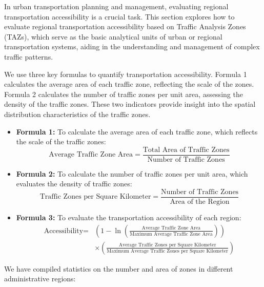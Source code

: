 \documentclass{mcmthesis}
\begin{document}
In urban transportation planning and management, evaluating regional transportation accessibility is a crucial task. This section explores how to evaluate regional transportation accessibility based on Traffic Analysis Zones (TAZs), which serve as the basic analytical units of urban or regional transportation systems, aiding in the understanding and management of complex traffic patterns.

We use three key formulas to quantify transportation accessibility. Formula 1 calculates the average area of each traffic zone, reflecting the scale of the zones. Formula 2 calculates the number of traffic zones per unit area, assessing the density of the traffic zones. These two indicators provide insight into the spatial distribution characteristics of the traffic zones.


\begin{itemize}
    \item \textbf{Formula 1:} To calculate the average area of each traffic zone, which reflects the scale of the traffic zones:
    \[
    \text{Average Traffic Zone Area} = \frac{\text{Total Area of Traffic Zones}}{\text{Number of Traffic Zones}}
    \]

    \item \textbf{Formula 2:} To calculate the number of traffic zones per unit area, which evaluates the density of traffic zones:
    \[
    \text{Traffic Zones per Square Kilometer} = \frac{\text{Number of Traffic Zones}}{\text{Area of the Region}}
    \]

    \item \textbf{Formula 3:} To evaluate the transportation accessibility of each region:
    \[
\begin{split}
\text{Accessibility} = &\left( 1 - \ln \left( \frac{\text{Average Traffic Zone Area}}{\text{Maximum Average Traffic Zone Area}} \right) \right) \\
&\times \left( \frac{\text{Average Traffic Zones per Square Kilometer}}{\text{Maximum Average Traffic Zones per Square Kilometer}} \right)
\end{split}
\]

\end{itemize}


 We have compiled statistics on the number and area of zones in different administrative regions:
\end{document}
